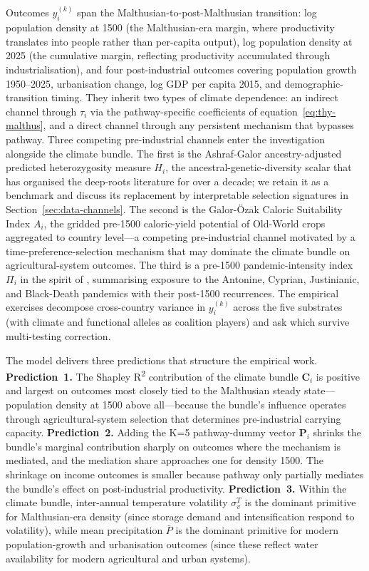 \documentclass[11pt,letterpaper]{article}
\begin{document}
Outcomes $y_i^{(k)}$ span the Malthusian-to-post-Malthusian transition: log population density at 1500 (the Malthusian-era margin, where productivity translates into people rather than per-capita output), log population density at 2025 (the cumulative margin, reflecting productivity accumulated through industrialisation), and four post-industrial outcomes covering population growth 1950--2025, urbanisation change, log GDP per capita 2015, and demographic-transition timing. They inherit two types of climate dependence: an indirect channel through $\tau_i$ via the pathway-specific coefficients of equation~\eqref{eq:thy-malthus}, and a direct channel through any persistent mechanism that bypasses pathway. Three competing pre-industrial channels enter the investigation alongside the climate bundle. The first is the Ashraf-Galor ancestry-adjusted predicted heterozygosity measure $H_i$, the ancestral-genetic-diversity scalar that has organised the deep-roots literature for over a decade; we retain it as a benchmark and discuss its replacement by interpretable selection signatures in Section~\ref{sec:data-channels}. The second is the Galor-\"Ozak Caloric Suitability Index $A_i$, the gridded pre-1500 caloric-yield potential of Old-World crops aggregated to country level---a competing pre-industrial channel motivated by a time-preference-selection mechanism that may dominate the climate bundle on agricultural-system outcomes. The third is a pre-1500 pandemic-intensity index $\Pi_i$ in the spirit of \citet{voigtlander2013how}, summarising exposure to the Antonine, Cyprian, Justinianic, and Black-Death pandemics with their post-1500 recurrences. The empirical exercises decompose cross-country variance in $y_i^{(k)}$ across the five substrates (with climate and functional alleles as coalition players) and ask which survive multi-testing correction.

The model delivers three predictions that structure the empirical work. \textbf{Prediction~1.} The Shapley R\textsuperscript{2} contribution of the climate bundle $\mathbf{C}_i$ is positive and largest on outcomes most closely tied to the Malthusian steady state---population density at 1500 above all---because the bundle's influence operates through agricultural-system selection that determines pre-industrial carrying capacity. \textbf{Prediction~2.} Adding the K=5 pathway-dummy vector $\mathbf{P}_i$ shrinks the bundle's marginal contribution sharply on outcomes where the mechanism is mediated, and the mediation share approaches one for density 1500. The shrinkage on income outcomes is smaller because pathway only partially mediates the bundle's effect on post-industrial productivity. \textbf{Prediction~3.} Within the climate bundle, inter-annual temperature volatility $\sigma_v^T$ is the dominant primitive for Malthusian-era density (since storage demand and intensification respond to volatility), while mean precipitation $\bar P$ is the dominant primitive for modern population-growth and urbanisation outcomes (since these reflect water availability for modern agricultural and urban systems).
\end{document}
